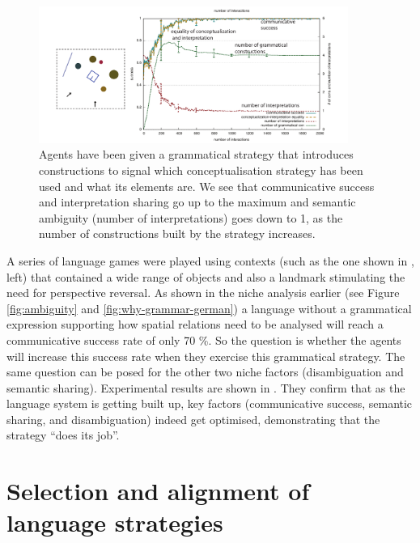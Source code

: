 \begin{figure}[htb!]
\centerline{
\includegraphics[width=0.9\textwidth]{chap12/figs/why-grammar-development-3.pdf}
}
\caption{{Agents have been given a grammatical strategy that introduces constructions to signal 
which conceptualisation strategy has been used and what its elements are. We see that communicative success and 
interpretation sharing go up to the maximum and semantic ambiguity (number of interpretations) goes down to 1, as 
the number of constructions built by the strategy increases. 
\label{fig:gramdev3}}
} 
\end{figure} 

A series of language games were played using contexts (such as the one shown in , left)
that contained a wide range of objects and also a landmark stimulating the need for perspective reversal. As shown in 
the niche analysis earlier (see Figure \ref{fig:ambiguity} and \ref{fig:why-grammar-german}) a language without 
a grammatical expression supporting how spatial relations need to be analysed will reach a 
communicative success rate of only 70 \%. So the question is whether the agents will increase this success rate when 
they exercise this grammatical strategy. The same question can be posed for the other two niche factors (disambiguation 
and semantic sharing). Experimental results are shown in . They confirm that as 
the language system is getting built up, key factors (communicative success, semantic sharing, and disambiguation) 
indeed get optimised, demonstrating that the strategy ``does its job''. 
\clearpage
\section{Selection and alignment of language strategies}

